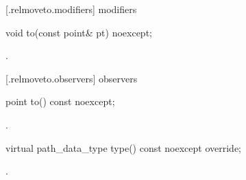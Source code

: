  [\iotwod.relmoveto.modifiers]{ modifiers}

\begin{itemdecl}
    void to(const point& pt) noexcept;
\end{itemdecl}
\begin{itemdescr}
	\pnum
	\postconditions
	.
	
\end{itemdescr}

 [\iotwod.relmoveto.observers]{ observers}

\begin{itemdecl}
    point to() const noexcept;
\end{itemdecl}
\begin{itemdescr}
	\pnum
	\returns
	.

\end{itemdescr}

\begin{itemdecl}
    virtual path_data_type type() const noexcept override;
\end{itemdecl}
\begin{itemdescr}
	\pnum
	\returns
	.

\end{itemdescr}
